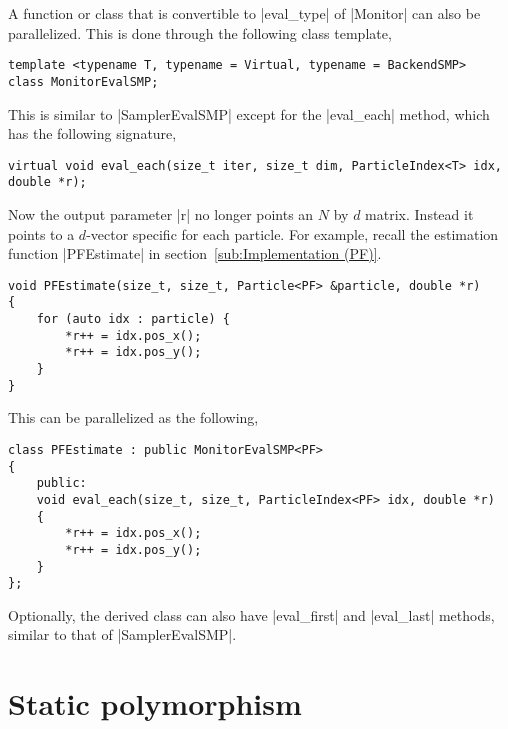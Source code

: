 A function or class that is convertible to |eval_type| of |Monitor| can also be
parallelized. This is done through the following class template,
\begin{Verbatim}
template <typename T, typename = Virtual, typename = BackendSMP>
class MonitorEvalSMP;
\end{Verbatim}
This is similar to |SamplerEvalSMP| except for the |eval_each| method, which
has the following signature,
\begin{Verbatim}
virtual void eval_each(size_t iter, size_t dim, ParticleIndex<T> idx, double *r);
\end{Verbatim}
Now the output parameter |r| no longer points an $N$ by $d$ matrix. Instead it
points to a $d$-vector specific for each particle. For example, recall the
estimation function |PFEstimate| in
section~\ref{sub:Implementation (PF)}.
\begin{Verbatim}
void PFEstimate(size_t, size_t, Particle<PF> &particle, double *r)
{
    for (auto idx : particle) {
        *r++ = idx.pos_x();
        *r++ = idx.pos_y();
    }
}
\end{Verbatim}
This can be parallelized as the following,
\begin{Verbatim}
class PFEstimate : public MonitorEvalSMP<PF>
{
    public:
    void eval_each(size_t, size_t, ParticleIndex<PF> idx, double *r)
    {
        *r++ = idx.pos_x();
        *r++ = idx.pos_y();
    }
};
\end{Verbatim}
Optionally, the derived class can also have |eval_first| and |eval_last|
methods, similar to that of |SamplerEvalSMP|.

\section{Static polymorphism}
\label{sec:Static polymorphism}

